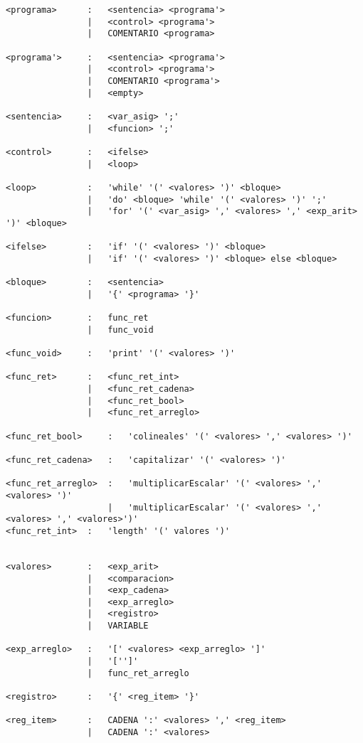 \begin{verbatim}
<programa>      :   <sentencia> <programa'>   
                |   <control> <programa'>   
                |   COMENTARIO <programa>   

<programa'>     :   <sentencia> <programa'>   
                |   <control> <programa'>   
                |   COMENTARIO <programa'>   
                |   <empty>

<sentencia>     :   <var_asig> ';'
                |   <funcion> ';'

<control>       :   <ifelse>
                |   <loop>

<loop>          :   'while' '(' <valores> ')' <bloque>
                |   'do' <bloque> 'while' '(' <valores> ')' ';' 
                |   'for' '(' <var_asig> ',' <valores> ',' <exp_arit> ')' <bloque>

<ifelse>        :   'if' '(' <valores> ')' <bloque>
                |   'if' '(' <valores> ')' <bloque> else <bloque>

<bloque>        :   <sentencia>
                |   '{' <programa> '}'

<funcion>       :   func_ret
                |   func_void

<func_void>     :   'print' '(' <valores> ')'

<func_ret>      :   <func_ret_int>
                |   <func_ret_cadena>
                |   <func_ret_bool>
                |   <func_ret_arreglo>

<func_ret_bool>     :   'colineales' '(' <valores> ',' <valores> ')'

<func_ret_cadena>   :   'capitalizar' '(' <valores> ')'

<func_ret_arreglo>  :   'multiplicarEscalar' '(' <valores> ',' <valores> ')'
                    |   'multiplicarEscalar' '(' <valores> ',' <valores> ',' <valores>')'
<func_ret_int>  :   'length' '(' valores ')'


<valores>       :   <exp_arit>
                |   <comparacion>
                |   <exp_cadena>
                |   <exp_arreglo>
                |   <registro>
                |   VARIABLE

<exp_arreglo>   :   '[' <valores> <exp_arreglo> ']'
                |   '['']'
                |   func_ret_arreglo

<registro>      :   '{' <reg_item> '}'

<reg_item>      :   CADENA ':' <valores> ',' <reg_item>
                |   CADENA ':' <valores> 


\end{verbatim}

